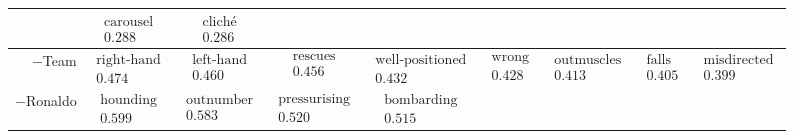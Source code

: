 \documentclass[10pt, a4paper]{UUThesisTemplate}
\begin{document}
\begin{table}
\begin{tabular}{r|c c c c c c c c}
& $ \begin{matrix} \text{carousel} \\ 0.288 \end{matrix}$
& $ \begin{matrix} \text{cliché} \\ 0.286 \end{matrix}$
\\\hline
$-$Team
& $ \begin{matrix} \text{right-hand} \\ 0.474 \end{matrix}$
& $ \begin{matrix} \text{left-hand} \\ 0.460 \end{matrix}$
& $ \begin{matrix} \text{rescues} \\ 0.456 \end{matrix}$
& $ \begin{matrix} \text{well-positioned} \\ 0.432 \end{matrix}$
& $ \begin{matrix} \text{wrong} \\ 0.428 \end{matrix}$
& $ \begin{matrix} \text{outmuscles} \\ 0.413 \end{matrix}$
& $ \begin{matrix} \text{falls} \\ 0.405 \end{matrix}$
& $ \begin{matrix} \text{misdirected} \\ 0.399 \end{matrix}$
\\\hline
$-$Ronaldo
& $ \begin{matrix} \text{hounding} \\ 0.599 \end{matrix}$
& $ \begin{matrix} \text{outnumber} \\ 0.583 \end{matrix}$
& $ \begin{matrix} \text{pressurising} \\ 0.520 \end{matrix}$
& $ \begin{matrix} \text{bombarding} \\ 0.515 \end{matrix}$

\end{tabular}
\end{table}
\end{document}
